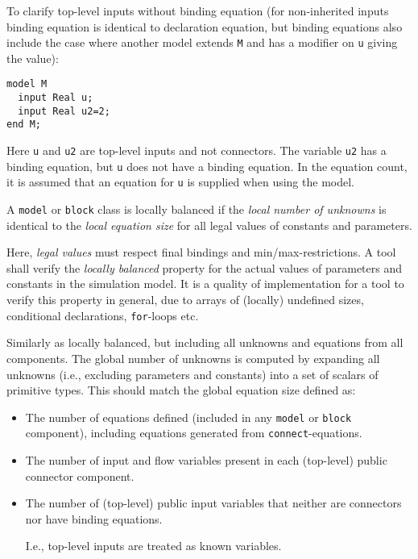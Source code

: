 \begin{nonnormative}
To clarify top-level inputs without binding equation (for non-inherited inputs binding equation is identical to declaration equation, but binding equations also include the case where another model extends \lstinline!M! and has a modifier on \lstinline!u! giving the value):
\begin{lstlisting}[language=modelica]
model M
  input Real u;
  input Real u2=2;
end M;
\end{lstlisting}

Here \lstinline!u! and \lstinline!u2! are top-level inputs and not connectors.
The variable \lstinline!u2! has a binding equation, but \lstinline!u! does not have a binding equation.
In the equation count, it is assumed that an equation for \lstinline!u! is supplied when using the model.
\end{nonnormative}

\begin{definition}
A \lstinline!model! or \lstinline!block! class is locally balanced if the \emph{local number of unknowns} is identical to the \emph{local equation size} for all legal values of constants and parameters.
\end{definition}

\begin{nonnormative}
Here, \emph{legal values} must respect final bindings and min/max-restrictions.
A tool shall verify the \emph{locally balanced} property for the actual values of parameters and constants in the simulation model.
It is a quality of implementation for a tool to verify this property in general, due to arrays of (locally) undefined sizes, conditional declarations, \lstinline!for!-loops etc.
\end{nonnormative}

\begin{definition}
Similarly as locally balanced, but including all unknowns and equations from all components.
The global number of unknowns is computed by expanding all unknowns (i.e., excluding parameters and constants) into a set of scalars of primitive types.
This should match the global equation size defined as:
\begin{itemize}
\item
  The number of equations defined (included in any \lstinline!model! or \lstinline!block! component), including equations generated from \lstinline!connect!-equations.
\item
  The number of input and flow variables present in each (top-level) public connector component.
\item
  The number of (top-level) public input variables that neither are connectors nor have binding equations.
  \begin{nonnormative}
  I.e., top-level inputs are treated as known variables.
  \end{nonnormative}
\end{itemize}
\end{definition}

